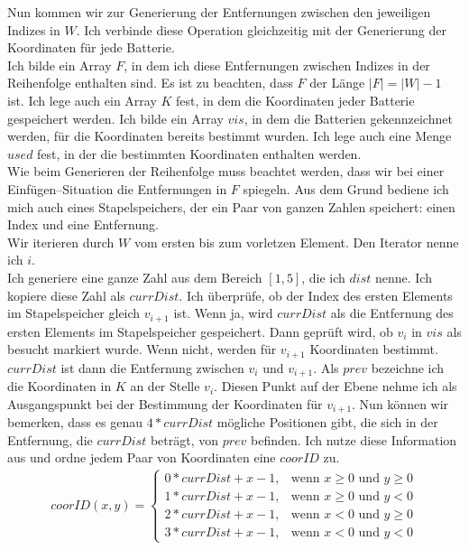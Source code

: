 \documentclass[a4paper,10pt,ngerman]{scrartcl}
\begin{document}
Nun kommen wir zur Generierung der Entfernungen zwischen den jeweiligen Indizes in $W$.
Ich verbinde diese Operation gleichzeitig mit der Generierung der Koordinaten für jede Batterie.\\
Ich bilde ein Array $F$, in dem ich diese Entfernungen zwischen Indizes in der Reihenfolge enthalten sind.
Es ist zu beachten, dass $F$ der Länge $|F| = |W|-1$ ist.
Ich lege auch ein Array $K$ fest, in dem die Koordinaten jeder Batterie gespeichert werden.
Ich bilde ein Array $vis$, in dem die Batterien gekennzeichnet werden, für die Koordinaten bereits bestimmt wurden.
Ich lege auch eine Menge $used$ fest, in der die bestimmten Koordinaten enthalten werden.\\
Wie beim Generieren der Reihenfolge muss beachtet werden, 
dass wir bei einer Einfügen--Situation die Entfernungen in $F$ spiegeln. Aus dem Grund bediene ich
mich auch eines Stapelspeichers, der ein Paar von ganzen Zahlen speichert: einen Index und eine Entfernung.\\
Wir iterieren durch $W$ vom ersten bis zum vorletzen Element. Den Iterator nenne ich $i$.\\
Ich generiere eine ganze Zahl aus dem Bereich $[1,5]$, die ich $dist$ nenne.
Ich kopiere diese Zahl als $currDist$. Ich überprüfe, ob der Index des ersten Elements im Stapelspeicher 
gleich $v_{i+1}$ ist. Wenn ja, wird $currDist$ als die Entfernung des ersten Elements im Stapelspeicher gespeichert.
Dann geprüft wird, ob $v_i$ in $vis$ als besucht markiert wurde. Wenn nicht, werden für $v_{i+1}$ Koordinaten 
bestimmt. $currDist$ ist dann die Entfernung zwischen $v_i$ und $v_{i+1}$.
Als $prev$ bezeichne ich die Koordinaten in $K$ an der Stelle $v_{i}$.
Diesen Punkt auf der Ebene nehme ich als Ausgangspunkt bei der Bestimmung der Koordinaten für $v_{i+1}$.
Nun können wir bemerken, dass es genau $4*currDist$ mögliche Positionen gibt, die sich in der Entfernung, die $currDist$
beträgt, von $prev$ befinden. Ich nutze diese Information aus und ordne jedem Paar von Koordinaten eine $coorID$ zu.
\begin{align}
  coorID(x,y) =
  \begin{cases}
      0*currDist + x-1,& \text{wenn } x \geqslant 0 \text{ und } y \geqslant 0\\
      1*currDist + x-1,& \text{wenn } x \geqslant 0 \text{ und } y < 0\\
      2*currDist + x-1,& \text{wenn } x < 0 \text{ und } y \geqslant 0\\
      3*currDist + x-1,& \text{wenn } x < 0 \text{ und } y < 0
  \end{cases}
\label{eq:coorID}
\end{align}
\end{document}
